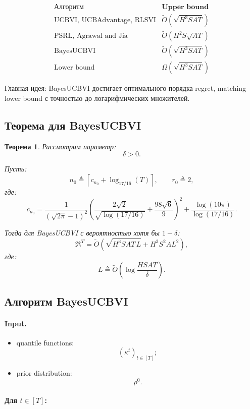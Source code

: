 \documentclass[12pt,a4paper]{article}
\newtheorem{theorem}{Теорема}
\begin{document}
\[
\begin{array}{c|c}
\textbf{Алгоритм} & \textbf{Upper bound} \\
\hline
\text{UCBVI, UCBAdvantage, RLSVI}
&
\widetilde O(\sqrt{H^3SAT})
\\
\text{PSRL, Agrawal and Jia}
&
\widetilde O(H^2S\sqrt{AT})
\\
\text{BayesUCBVI}
&
\widetilde O(\sqrt{H^3SAT})
\\
\text{Lower bound}
&
\Omega(\sqrt{H^3SAT})
\end{array}
\]

Главная идея: BayesUCBVI достигает оптимального порядка regret, matching lower bound с точностью до логарифмических множителей.

\subsection{Теорема для BayesUCBVI}

\begin{theorem}
Рассмотрим параметр:
\[
\delta>0.
\]

Пусть:
\[
n_0
\triangleq
\left\lceil
c_{n_0}
+
\log_{17/16}(T)
\right\rceil,
\qquad
r_0\triangleq 2,
\]
где:
\[
c_{n_0}
=
\frac{1}{(\sqrt{2\pi}-1)^2}
\left(
\frac{2\sqrt 2}{\sqrt{\log(17/16)}}
+
\frac{98\sqrt 6}{9}
\right)^2
+
\frac{\log(10\pi)}{\log(17/16)}.
\]

Тогда для BayesUCBVI с вероятностью хотя бы $1-\delta$:
\[
\mathfrak R^T
=
\widetilde O
\left(
\sqrt{H^3SAT\,L}
+
H^3S^2AL^2
\right),
\]
где:
\[
L
\triangleq
\widetilde O
\left(
\log\frac{HSAT}{\delta}
\right).
\]
\end{theorem}

\subsection{Алгоритм BayesUCBVI}

\paragraph{Input.}

\begin{itemize}
    \item quantile functions:
    \[
    (\kappa^t)_{t\in[T]};
    \]
    \item prior distribution:
    \[
    \rho^0.
    \]
\end{itemize}

\paragraph{Для $t\in[T]$:}
\end{document}
